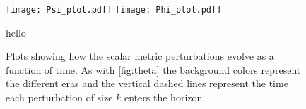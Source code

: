 \documentclass[12pt]{article}
\begin{document}
\begin{figure}[h]
    \centering
    \texttt{[image: Psi\_plot.pdf]} 
    \texttt{[image: Phi\_plot.pdf]} 
    \caption{hello}
    \label{fig:phi_psi}
    \caption{Plots showing how the scalar metric perturbations evolve as a function of time. As with \cref{fig:theta} the background colors represent the different eras and the vertical dashed lines represent the time each perturbation of size $k$ enters the horizon.}
\end{figure}



{}

\end{document}
